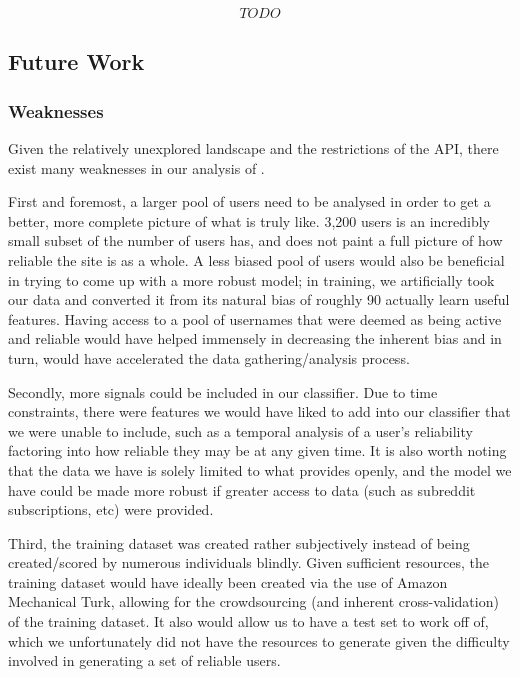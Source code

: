 \[TODO\]
\subsection{Future Work} %
\label{sub:future_work}

\subsubsection{Weaknesses}
Given the relatively unexplored landscape and the restrictions of the \reddit{}
API, there exist many weaknesses in our analysis of \reddit{}.

First and foremost, a larger pool of users need to be analysed in order to get a
better, more complete picture of what \reddit{} is truly like. 3,200 users is an
incredibly small subset of the number of users \reddit{} has, and does not paint
a full picture of how reliable the site is as a whole. A less biased pool of
users would also be beneficial in trying to come up with a more robust model; in
training, we artificially took our data and converted it from its natural bias
of roughly 90%
actually learn useful features. Having access to a pool of usernames that were
deemed as being active and reliable would have helped immensely in decreasing
the inherent bias and in turn, would have accelerated the data
gathering/analysis process.

Secondly, more signals could be included in our classifier. Due to time
constraints, there were features we would have liked to add into our classifier
that we were unable to include, such as a temporal analysis of a user's
reliability factoring into how reliable they may be at any given time. It is
also worth noting that the data we have is solely limited to what \reddit{}
provides openly, and the model we have could be made more robust if greater
access to data (such as subreddit subscriptions, etc) were provided.

Third, the training dataset was created rather subjectively instead of being
created/scored by numerous individuals blindly. Given sufficient resources, the
training dataset would have ideally been created via the use of Amazon
Mechanical Turk, allowing for the crowdsourcing (and inherent cross-validation)
of the training dataset. It also would allow us to have a test set to work off
of, which we unfortunately did not have the resources to generate given the
difficulty involved in generating a set of reliable users.


